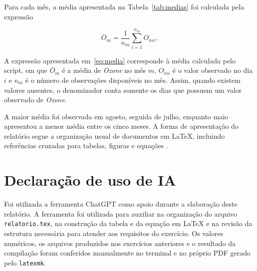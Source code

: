\documentclass[12pt,a4paper]{article}
\begin{document}
Para cada mês, a média apresentada na Tabela~\ref{tab:medias} foi
calculada pela expressão

\begin{equation}
\bar{O}_m =
\frac{1}{n_m}
\sum_{i=1}^{n_m} O_{mi},
\label{eq:media}
\end{equation}

A expressão apresentada em~\eqref{eq:media} corresponde à média calculada pelo script, em que $\bar{O}_m$ é a média de \textit{Ozone} no mês $m$, $O_{mi}$ é o valor observado no dia $i$ e $n_m$ é o número de observações disponíveis no mês. Assim, quando existem valores ausentes, o denominador conta somente os dias que possuem um valor observado de \textit{Ozone}.

A maior média foi observada em agosto, seguida de julho, enquanto maio
apresentou a menor média entre os cinco meses. A forma de apresentação
do relatório segue a organização usual de documentos em LaTeX,
incluindo referências cruzadas para tabelas, figuras e equações
\citep{lamport1994}.

\section*{Declaração de uso de IA}

Foi utilizada a ferramenta ChatGPT como apoio durante a elaboração deste
relatório. A ferramenta foi utilizada para auxiliar na organização do
arquivo \texttt{relatorio.tex}, na construção da tabela e da equação em
LaTeX e na revisão da estrutura necessária para atender aos requisitos
do exercício. Os valores numéricos, os arquivos produzidos nos
exercícios anteriores e o resultado da compilação foram conferidos
manualmente no terminal e no próprio PDF gerado pelo \texttt{latexmk}.



\end{document}

